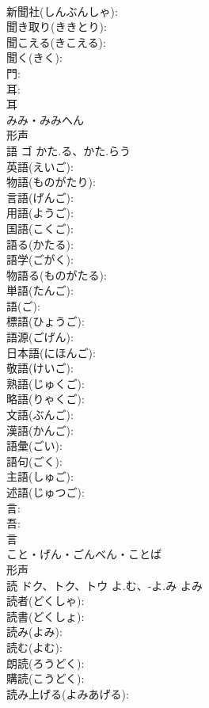 \documentclass[8pt]{extreport}
\begin{document}
\begin{CJK}{UTF8}{min}
\\	新聞社(しんぶんしゃ): 
\\	聞き取り(ききとり): 
\\	聞こえる(きこえる): 
\\	聞く(きく): 
\\	門: 
\\	耳: 
\\	耳	
\\	みみ・みみへん	
\\	形声 
\\	語	ゴ	かた.る、かた.らう		
\\	英語(えいご): 
\\	物語(ものがたり): 
\\	言語(げんご): 
\\	用語(ようご): 
\\	国語(こくご): 
\\	語る(かたる): 
\\	語学(ごがく): 
\\	物語る(ものがたる): 
\\	単語(たんご): 
\\	語(ご): 
\\	標語(ひょうご): 
\\	語源(ごげん): 
\\	日本語(にほんご): 
\\	敬語(けいご): 
\\	熟語(じゅくご): 
\\	略語(りゃくご): 
\\	文語(ぶんご): 
\\	漢語(かんご): 
\\	語彙(ごい): 
\\	語句(ごく): 
\\	主語(しゅご): 
\\	述語(じゅつご): 
\\	言: 
\\	吾: 
\\	言	
\\	こと・げん・ごんべん・ことば	
\\	形声 
\\	読	ドク、トク、トウ	よ.む、-よ.み	よみ	
\\	読者(どくしゃ): 
\\	読書(どくしょ): 
\\	読み(よみ): 
\\	読む(よむ): 
\\	朗読(ろうどく): 
\\	購読(こうどく): 
\\	読み上げる(よみあげる): 

\end{CJK}
\end{document}
